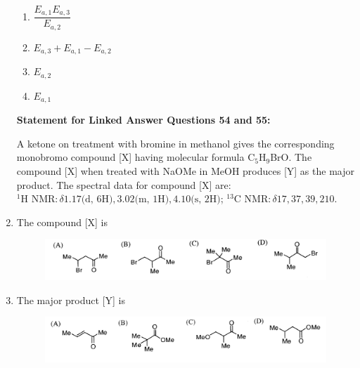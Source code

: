 \documentclass[journal,12pt,onecolumn]{IEEEtran}
\theoremstyle{remark}
\begin{document}
\begin{enumerate}
\begin{multicols}{2}
\begin{enumerate}
    \item \( \dfrac{E_{a,1}E_{a,3}}{E_{a,2}} \)
    \item \( E_{a,3} + E_{a,1} - E_{a,2} \)
    \item \( E_{a,2} \)
    \item \( E_{a,1} \)
\end{enumerate}
\end{multicols}

 

\noindent\textbf{Statement for Linked Answer Questions 54 and 55:}

A ketone on treatment with bromine in methanol gives the corresponding monobromo compound [X] having molecular formula C\(_5\)H\(_9\)BrO. The compound [X] when treated with NaOMe in MeOH produces [Y] as the major product. The spectral data for compound [X] are: \( ^1\text{H NMR}: \delta 1.17 \text{(d, 6H)}, 3.02 \text{(m, 1H)}, 4.10 \text{(s, 2H)} \); \(^{13}\text{C NMR}: \delta 17, 37, 39, 210 \).

 

\item    \hspace{0.5cm} The compound [X] is  \hfill{}


\begin{figure}
    \centering
    \includegraphics[width=\textwidth]{figs/image19.png}
    \caption{}
    \label{fig:figure19}
\end{figure}
   
 


\item    \hspace{0.5cm} The major product [Y] is  \hfill{}
\begin{figure}
    \centering
    \includegraphics[width=\textwidth]{figs/image20.png}
    \caption{}
    \label{fig:figure20}
\end{figure}



\end{enumerate}
\end{document}
